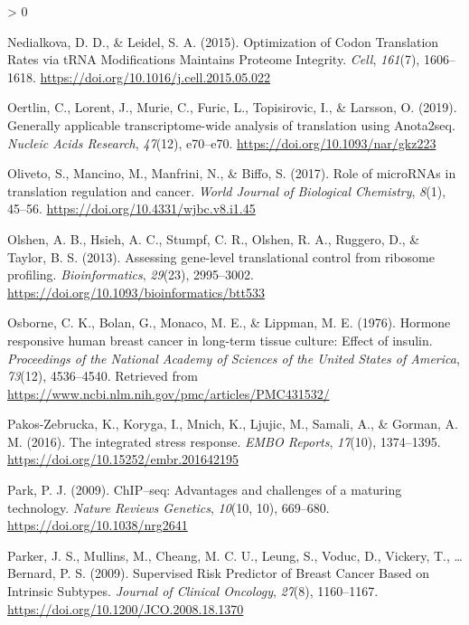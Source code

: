 \documentclass[
  12pt,
  openany]{book}
\newlength{\cslhangindent}
\newenvironment{CSLReferences}[2] %
 {%
  \setlength{\parindent}{0pt}
  \ifodd #1 \everypar{\setlength{\hangindent}{\cslhangindent}}\ignorespaces\fi
  \ifnum #2 > 0
  \setlength{\parskip}{#2\baselineskip}
  \fi
 }%
 {}
\begin{document}
\begin{CSLReferences}{1}{0}
\leavevmode\hypertarget{ref-Nedialkova2015}{}%
Nedialkova, D. D., \& Leidel, S. A. (2015). Optimization of {Codon Translation Rates} via {tRNA Modifications Maintains Proteome Integrity}. \emph{Cell}, \emph{161}(7), 1606--1618. \url{https://doi.org/10.1016/j.cell.2015.05.022}

\leavevmode\hypertarget{ref-Oertlin2019}{}%
Oertlin, C., Lorent, J., Murie, C., Furic, L., Topisirovic, I., \& Larsson, O. (2019). Generally applicable transcriptome-wide analysis of translation using Anota2seq. \emph{Nucleic Acids Research}, \emph{47}(12), e70--e70. \url{https://doi.org/10.1093/nar/gkz223}

\leavevmode\hypertarget{ref-Oliveto2017}{}%
Oliveto, S., Mancino, M., Manfrini, N., \& Biffo, S. (2017). Role of {microRNAs} in translation regulation and cancer. \emph{World Journal of Biological Chemistry}, \emph{8}(1), 45--56. \url{https://doi.org/10.4331/wjbc.v8.i1.45}

\leavevmode\hypertarget{ref-Olshen2013}{}%
Olshen, A. B., Hsieh, A. C., Stumpf, C. R., Olshen, R. A., Ruggero, D., \& Taylor, B. S. (2013). Assessing gene-level translational control from ribosome profiling. \emph{Bioinformatics}, \emph{29}(23), 2995--3002. \url{https://doi.org/10.1093/bioinformatics/btt533}

\leavevmode\hypertarget{ref-Osborne1976}{}%
Osborne, C. K., Bolan, G., Monaco, M. E., \& Lippman, M. E. (1976). Hormone responsive human breast cancer in long-term tissue culture: Effect of insulin. \emph{Proceedings of the National Academy of Sciences of the United States of America}, \emph{73}(12), 4536--4540. Retrieved from \url{https://www.ncbi.nlm.nih.gov/pmc/articles/PMC431532/}

\leavevmode\hypertarget{ref-Pakos-Zebrucka2016}{}%
Pakos-Zebrucka, K., Koryga, I., Mnich, K., Ljujic, M., Samali, A., \& Gorman, A. M. (2016). The integrated stress response. \emph{EMBO Reports}, \emph{17}(10), 1374--1395. \url{https://doi.org/10.15252/embr.201642195}

\leavevmode\hypertarget{ref-Park2009}{}%
Park, P. J. (2009). {ChIP}--seq: Advantages and challenges of a maturing technology. \emph{Nature Reviews Genetics}, \emph{10}(10, 10), 669--680. \url{https://doi.org/10.1038/nrg2641}

\leavevmode\hypertarget{ref-Parker2009}{}%
Parker, J. S., Mullins, M., Cheang, M. C. U., Leung, S., Voduc, D., Vickery, T., \ldots{} Bernard, P. S. (2009). Supervised {Risk Predictor} of {Breast Cancer Based} on {Intrinsic Subtypes}. \emph{Journal of Clinical Oncology}, \emph{27}(8), 1160--1167. \url{https://doi.org/10.1200/JCO.2008.18.1370}


\end{CSLReferences}
\end{document}
